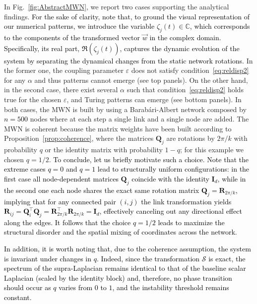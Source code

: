 \documentclass[aps,showpacs,preprintnumbers,amsmath,amssymb,twocolumn,superscriptaddress,floatfix,nofootinbib,10pt,pre]{revtex4-1}
\begin{document}
In Fig.~\ref{fig:AbstractMWN}, we report two cases supporting the analytical findings. \textcolor{black}{For the sake of clarity, note that, to ground the visual representation of our numerical patterns, we introduce the variable $\zeta_j(t)\in \mathbb{C}$, which corresponds to the components of the transformed vector $\vec{w}$ in the complex domain. Specifically, its real part, $\Re(\zeta_j(t))$, captures the dynamic evolution of the system by separating the dynamical changes from the static network rotations.} In the former one, the coupling parameter $\varepsilon$ does not satisfy condition~\eqref{eq:reldisp2} for any $\alpha$ and thus patterns cannot emerge (see top panels). On the other hand, in the second case, there exist several $\alpha$ such that condition~\eqref{eq:reldisp2} holds true for the chosen $\varepsilon$, and Turing patterns can emerge (see bottom panels). In both cases, the MWN is built by using a Barab\'ari-Albert network composed by \textcolor{black}{$n=500$} nodes where at each step a single link and a single node are added. The MWN is coherent because the matrix weights have been built according to Proposition~\ref{prop:coherence}, where the matrices $\mathbf{Q}_j$ are rotations by $2\pi/k$ with probability $q$ or the identity matrix with probability $1-q$; for this example we chosen $q=1/2$. %
\textcolor{black}{To conclude, let us briefly motivate such a choice. Note that the extreme cases $q=0$ and $q=1$ lead to structurally uniform configurations: in the first case all node-dependent matrices $\mathbf{Q}_j$ coincide with the identity $\mathbf{I}_d$, while in the second one each node shares the exact same rotation matrix $\mathbf{Q}_j = \mathbf{R}_{2\pi/k}$, implying that for any connected pair $(i,j)$ the link transformation yields $\mathbf{R}_{ij} = \mathbf{Q}_i^\top \mathbf{Q}_j = \mathbf{R}_{2\pi/k}^\top \mathbf{R}_{2\pi/k} = \mathbf{I}_d$, effectively canceling out any directional effect along the edges. It follows that the choice $q=1/2$ leads to maximize the structural disorder and the spatial mixing of coordinates across the network.}

\textcolor{black}{In addition, it is worth noting that, due to the coherence assumption, the system is invariant under changes in $q$. Indeed, since the transformation $\mathcal S$ is exact, the spectrum of the supra-Laplacian remains identical to that of the baseline scalar Laplacian (scaled by the identity block) and, therefore, no phase transition should occur as $q$ varies from $0$ to $1$, and the instability threshold remains constant.}
\end{document}
